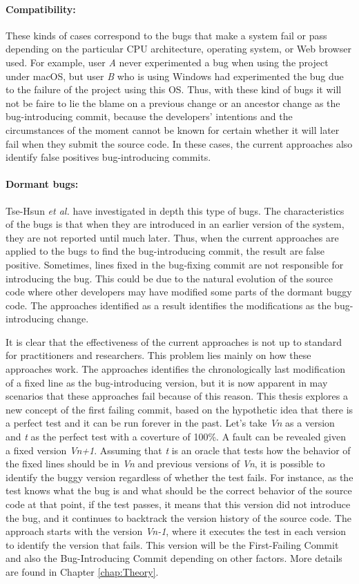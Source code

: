 \documentclass[a4paper, 12pt]{book}
\begin{document}
\paragraph {Compatibility:} These kinds of cases correspond to the bugs that make a system fail or pass depending on the particular CPU architecture, operating system, or Web browser used. For example, user \emph{A} never experimented a bug when using the project under macOS, but user \emph{B} who is using Windows had experimented the bug due to the failure of the project using this OS. Thus, with these kind of bugs it will not be faire to lie the blame on a previous change or an ancestor change as the bug-introducing commit, because the developers' intentions and the circumstances of the moment cannot be known for certain whether it will later fail when they submit the source code. In these cases, the current approaches also identify false positives bug-introducing commits.

\paragraph {Dormant bugs:} Tse-Hsun \emph{et al.} have investigated in depth this type of bugs. The characteristics of the bugs is that when they are introduced in an earlier version of the system, they are not reported until much later. Thus, when the current approaches are applied to the bugs to find the bug-introducing commit, the result are false positive. Sometimes, lines fixed in the bug-fixing commit are not responsible for introducing the bug. This could be due to the natural evolution of the source code where other developers may have modified some parts of the dormant buggy code. The approaches identified as a result identifies the modifications as the bug-introducing change.

It is clear that the effectiveness of the current approaches is not up to standard for practitioners and researchers. This problem lies mainly on how these approaches work. The approaches identifies the chronologically last modification of a fixed line as the bug-introducing version, but it is now apparent in may scenarios that these approaches fail because of this reason. This thesis explores a new concept of the first failing commit, based on the hypothetic idea that there is a perfect test and it can be run forever in the past. Let's take \emph{Vn} as a version and \emph{t} as the perfect test with a coverture of 100\%. A fault can be revealed given a fixed version \emph{Vn+1}. Assuming that \emph{t} is an oracle that tests how the behavior of the fixed lines should be in \emph{Vn} and previous versions of \emph{Vn}, it is possible to identify the buggy version regardless of  whether the test fails. For instance, as the test knows what the bug is and what should be the correct behavior of the source code at that point, if the test passes, it means that this version did not introduce the bug, and it continues to backtrack the version history of the source code. The approach starts with the version \emph{Vn-1}, where it executes the test in each version to identify the version that fails. This version will be the First-Failing Commit and also the Bug-Introducing Commit depending on other factors. More details are found in Chapter \ref{chap:Theory}.
\end{document}
